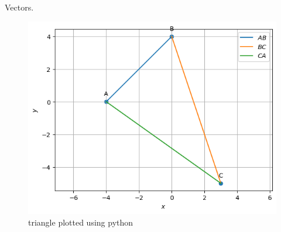 \begin{table}[H]
        \centering
        
        \caption{Vectors.}
        \label{tab:Vectors}
    \end{table}
\begin{figure}[H]
\includegraphics[width=\columnwidth]{vectors/figs/triangle.png}
\caption{triangle plotted using python}
\label{fig:i_triangle_py}
\end{figure}

